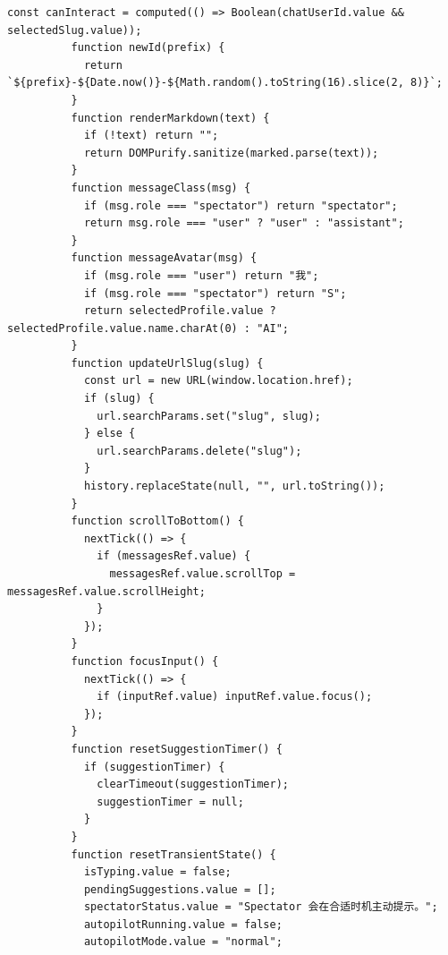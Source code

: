\documentclass[12pt,a4paper]{article}
\begin{document}
\newpage
{}
\fancyhead[R]{}
\begin{Verbatim}[fontsize=\footnotesize]
          const canInteract = computed(() => Boolean(chatUserId.value && selectedSlug.value));
          function newId(prefix) {
            return `${prefix}-${Date.now()}-${Math.random().toString(16).slice(2, 8)}`;
          }
          function renderMarkdown(text) {
            if (!text) return "";
            return DOMPurify.sanitize(marked.parse(text));
          }
          function messageClass(msg) {
            if (msg.role === "spectator") return "spectator";
            return msg.role === "user" ? "user" : "assistant";
          }
          function messageAvatar(msg) {
            if (msg.role === "user") return "我";
            if (msg.role === "spectator") return "S";
            return selectedProfile.value ? selectedProfile.value.name.charAt(0) : "AI";
          }
          function updateUrlSlug(slug) {
            const url = new URL(window.location.href);
            if (slug) {
              url.searchParams.set("slug", slug);
            } else {
              url.searchParams.delete("slug");
            }
            history.replaceState(null, "", url.toString());
          }
          function scrollToBottom() {
            nextTick(() => {
              if (messagesRef.value) {
                messagesRef.value.scrollTop = messagesRef.value.scrollHeight;
              }
            });
          }
          function focusInput() {
            nextTick(() => {
              if (inputRef.value) inputRef.value.focus();
            });
          }
          function resetSuggestionTimer() {
            if (suggestionTimer) {
              clearTimeout(suggestionTimer);
              suggestionTimer = null;
            }
          }
          function resetTransientState() {
            isTyping.value = false;
            pendingSuggestions.value = [];
            spectatorStatus.value = "Spectator 会在合适时机主动提示。";
            autopilotRunning.value = false;
            autopilotMode.value = "normal";
\end{Verbatim}
\newpage
{}
\fancyhead[R]{}
\end{document}
